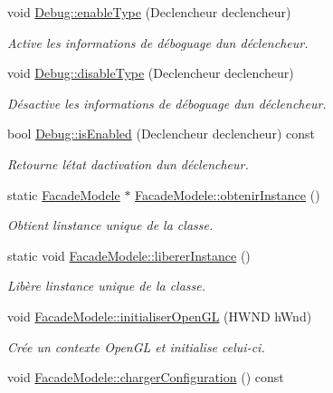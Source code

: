 \begin{DoxyCompactItemize}
void \hyperlink{group__inf2990_ga55375c6c14be967ed7f25eed578a6265}{Debug\+::enable\+Type} (Declencheur declencheur)
\begin{DoxyCompactList}\small\item\em Active les informations de déboguage d\textquotesingle{}un déclencheur. \end{DoxyCompactList}\item 
void \hyperlink{group__inf2990_gaefa863abf2c2b3c6c741b88b3f78e8b3}{Debug\+::disable\+Type} (Declencheur declencheur)
\begin{DoxyCompactList}\small\item\em Désactive les informations de déboguage d\textquotesingle{}un déclencheur. \end{DoxyCompactList}\item 
bool \hyperlink{group__inf2990_ga9a0c9b57363626ebb564cf07ad07fd06}{Debug\+::is\+Enabled} (Declencheur declencheur) const 
\begin{DoxyCompactList}\small\item\em Retourne l\textquotesingle{}état d\textquotesingle{}activation d\textquotesingle{}un déclencheur. \end{DoxyCompactList}\item 
static \hyperlink{class_facade_modele}{Facade\+Modele} $\ast$ \hyperlink{group__inf2990_ga63593b81c6f3cc2251e2b61d9e8fc670}{Facade\+Modele\+::obtenir\+Instance} ()
\begin{DoxyCompactList}\small\item\em Obtient l\textquotesingle{}instance unique de la classe. \end{DoxyCompactList}\item 
static void \hyperlink{group__inf2990_gacbf0495fda26f5be37089470dc5f4372}{Facade\+Modele\+::liberer\+Instance} ()
\begin{DoxyCompactList}\small\item\em Libère l\textquotesingle{}instance unique de la classe. \end{DoxyCompactList}\item 
void \hyperlink{group__inf2990_gabf12ccafbabf1049cb8327cf78699a1b}{Facade\+Modele\+::initialiser\+Open\+G\+L} (H\+W\+N\+D h\+Wnd)
\begin{DoxyCompactList}\small\item\em Crée un contexte Open\+G\+L et initialise celui-\/ci. \end{DoxyCompactList}\item 
void \hyperlink{group__inf2990_ga4967547e0683bfdca700118df1c18bca}{Facade\+Modele\+::charger\+Configuration} () const 

\end{DoxyCompactItemize}
